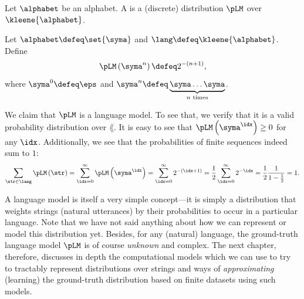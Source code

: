 \begin{definition} \label{def:language-model}
Let $\alphabet$ be an alphabet.
A  is a (discrete) distribution $\pLM$ over $\kleene{\alphabet}$.
\end{definition}

\begin{example}
Let $\alphabet \defeq \set{\syma}$ and $\lang \defeq \kleene{\alphabet}$.
Define
\begin{equation*}
    \pLM\left(\syma^n\right) \defeq 2^{-\left(n + 1\right)},
\end{equation*}
where $\syma^0 \defeq \eps$ and $\syma^n \defeq \underbrace{\syma\ldots\syma}_{n \text{ times}}$.

We claim that $\pLM$ is a language model.
To see that, we verify that it is a valid probability distribution over $\lang$. 
It is easy to see that $\pLM\left(\syma^\idx\right) \geq 0$ for any $\idx$.
Additionally, we see that the probabilities of finite sequences indeed sum to $1$:
\begin{equation*}
    \sum_{\str \in \lang} \pLM\left(\str\right) = \sum_{\idx = 0}^{\infty} \pLM\left(\syma^\idx\right) 
    = \sum_{\idx = 0}^\infty 2^{-\left(\idx + 1\right)} 
    = \frac{1}{2}\sum_{\idx = 0}^\infty 2^{-\idx} 
    = \frac{1}{2} \frac{1}{1 - \frac{1}{2}} = 1.
\end{equation*}
\end{example}

A language model is itself a very simple concept---it is simply a distribution that weights strings (natural utterances) by their probabilities to occur in a particular language.
Note that we have not said anything about how we can represent or model this distribution yet.
Besides, for any (natural) language, the ground-truth language model $\pLM$ is of course \emph{unknown} and complex.
The next chapter, therefore, discusses in depth the computational models which we can use to try to tractably represent distributions over strings and ways of \emph{approximating} (learning) the ground-truth distribution based on finite datasets using such models. 
